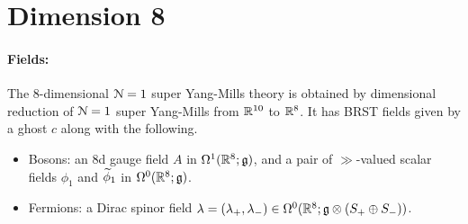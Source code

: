\documentclass[10pt, oneside]{article}
\begin{document}
% 
% 
% 
% 
% 

\section{Dimension 8}
\vspace{-10pt}
\paragraph{Fields:} 
The 8-dimensional $\mathcal{N}=1$ super Yang-Mills theory is obtained by dimensional reduction of $\mathcal{N}=1$ super Yang-Mills from $\mathbb R^{10}$ to $\mathbb R^8$.  It has BRST fields given by a ghost $c$ along with the following.
\begin{itemize}
 \item Bosons: an 8d gauge field $A$ in $\Omega^1(\mathbb R^8; \mathfrak{g})$, and a pair of $\gg$-valued scalar fields $\phi_1$ and $\widetilde{\phi}_1$ in $\Omega^0(\mathbb R^8; \mathfrak{g})$.
 \item Fermions: a Dirac spinor field $\lambda = (\lambda_+, \lambda_-) \in \Omega^0(\mathbb R^8; \mathfrak{g} \otimes(S_+ \oplus S_-))$.
\end{itemize}
\end{document}
